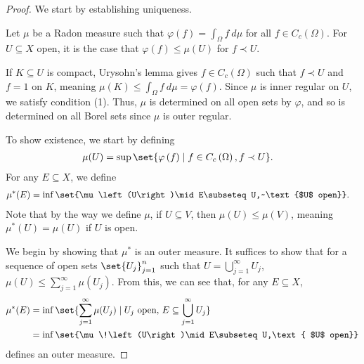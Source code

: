 \documentclass[10pt]{mypackage}
\begin{document}
\begin{proof}
  We start by establishing uniqueness.\newline

  Let $\mu$ be a Radon measure such that $\varphi(f) = \int_{\Omega}f\:d\mu$ for all $f\in C_c\left(\Omega\right)$. For $U\subseteq X$ open, it is the case that $\varphi(f) \leq \mu\!\left(U\right)$ for $f\prec U$.\newline

  If $K\subseteq U$ is compact, Urysohn's lemma gives $f\in C_c\left(\Omega\right)$ such that $f\prec U$ and $f = 1$ on $K$, meaning $\mu\!\left(K\right) \leq \int_{\Omega}f\:d\mu = \varphi(f)$. Since $\mu$ is inner regular on $U$, we satisfy condition (1). Thus, $\mu$ is determined on all open sets by $\varphi$, and so is determined on all Borel sets since $\mu$ is outer regular.\newline

  To show existence, we start by defining
  \begin{align*}
    \mu\!\left(U\right) &=\sup\set{\varphi\left(f\right)\mid f\in C_c\left(\Omega\right),f\prec U}.
  \end{align*}
  For any $E\subseteq X$, we define
  \begin{align*}
    \mu^{\ast}\!\left(E\right) &= \inf\set{\mu\left(U\right)\mid E\subseteq U,~\text{$U$ open}}.
  \end{align*}
  Note that by the way we define $\mu$, if $U\subseteq V$, then $\mu\!\left(U\right) \leq \mu\!\left(V\right)$, meaning $\mu^{\ast}\!\left(U\right) = \mu\!\left(U\right)$ if $U$ is open.\newline

  We begin by showing that $\mu^{\ast}$ is an outer measure. It suffices to show that for a sequence of open sets $\set{U_j}_{j=1}^{n}$ such that $U = \bigcup_{j=1}^{\infty}U_j$, $\mu\!\left(U\right) \leq \sum_{j=1}^{\infty}\mu\!\left(U_j\right)$. From this, we can see that, for any $E\subseteq X$,
  \begin{align*}
    \mu^{\ast}\!\left(E\right) &= \inf\set{\sum_{j=1}^{\infty}\mu\!\left(U_j\right)\mid U_j\text{ open, }E\subseteq \bigcup_{j=1}^{\infty}U_j}\\
                               &= \inf\set{\mu\!\left(U\right)\mid E\subseteq U,\text{ $U$ open}}
  \end{align*}
  defines an outer measure.\newline


\end{proof}
\end{document}

